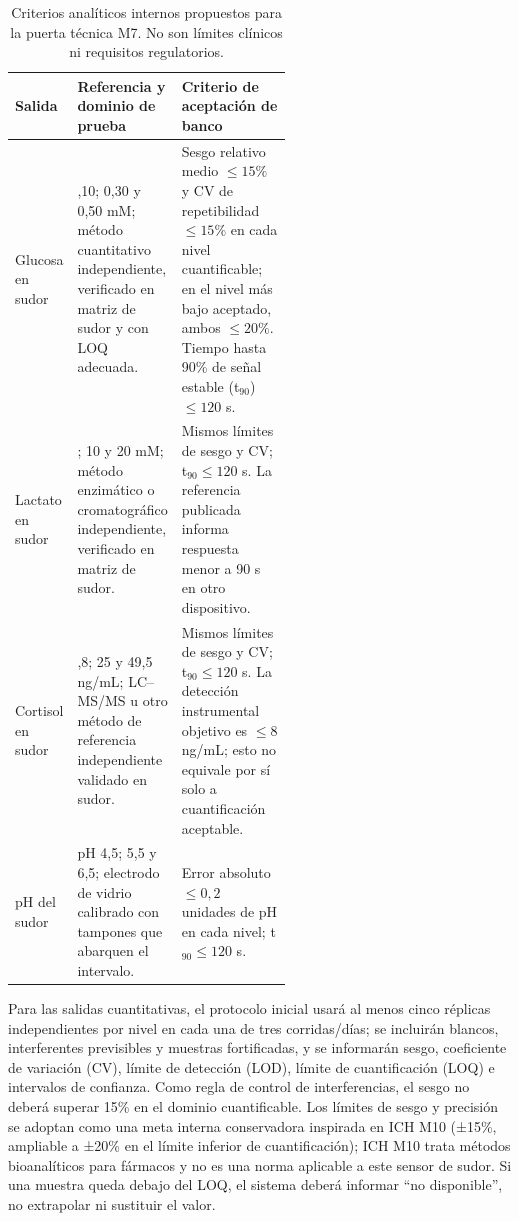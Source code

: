 {\small
\renewcommand{\arraystretch}{1.12}
\begin{table}[H]\centering
\caption{Criterios analíticos internos propuestos para la puerta técnica M7. No son límites clínicos ni requisitos regulatorios.}
\label{tab:criterios-analiticos}
\begin{tabularx}{\linewidth}{|>{\raggedright\arraybackslash}p{0.20\linewidth}|>{\raggedright\arraybackslash}p{0.35\linewidth}|>{\raggedright\arraybackslash}X|}
\hline
\textbf{Salida} & \textbf{Referencia y dominio de prueba} & \textbf{Criterio de aceptación de banco}\\\hline
Glucosa en sudor & 0,10; 0,30 y 0,50 mM; método cuantitativo independiente, verificado en matriz de sudor y con LOQ adecuada. & Sesgo relativo medio $\leq15\%$ y CV de repetibilidad $\leq15\%$ en cada nivel cuantificable; en el nivel más bajo aceptado, ambos $\leq20\%$. Tiempo hasta 90\% de señal estable (t$_{90}$) $\leq120$ s.\\\hline
Lactato en sudor & 1; 10 y 20 mM; método enzimático o cromatográfico independiente, verificado en matriz de sudor. & Mismos límites de sesgo y CV; t$_{90}\leq120$ s. La referencia publicada informa respuesta menor a 90 s en otro dispositivo.\\\hline
Cortisol en sudor & 9,8; 25 y 49,5 ng/mL; LC--MS/MS u otro método de referencia independiente validado en sudor. & Mismos límites de sesgo y CV; t$_{90}\leq120$ s. La detección instrumental objetivo es $\leq8$ ng/mL; esto no equivale por sí solo a cuantificación aceptable.\\\hline
pH del sudor & pH 4,5; 5,5 y 6,5; electrodo de vidrio calibrado con tampones que abarquen el intervalo. & Error absoluto $\leq0,2$ unidades de pH en cada nivel; t$_{90}\leq120$ s.\\\hline
\end{tabularx}
\end{table}}

Para las salidas cuantitativas, el protocolo inicial usará al menos cinco réplicas independientes por nivel en cada una de tres corridas/días; se incluirán blancos, interferentes previsibles y muestras fortificadas, y se informarán sesgo, coeficiente de variación (CV), límite de detección (LOD), límite de cuantificación (LOQ) e intervalos de confianza. Como regla de control de interferencias, el sesgo no deberá superar 15\% en el dominio cuantificable. Los límites de sesgo y precisión se adoptan como una meta interna conservadora inspirada en ICH M10 (±15\%, ampliable a ±20\% en el límite inferior de cuantificación); ICH M10 trata métodos bioanalíticos para fármacos y no es una norma aplicable a este sensor de sudor. Si una muestra queda debajo del LOQ, el sistema deberá informar ``no disponible'', no extrapolar ni sustituir el valor.

